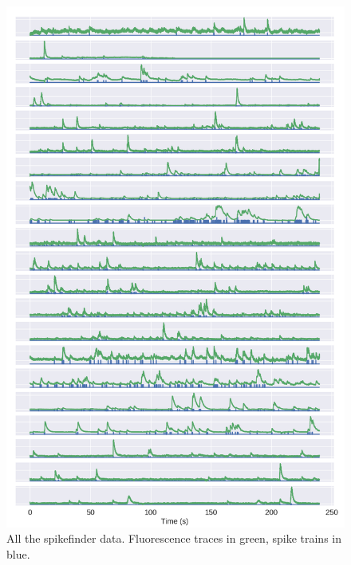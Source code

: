 \documentclass[a4paper,12pt]{article}
\theoremstyle{definition}
\begin{document}
\begin{figure}[p]
  \centering
  \includegraphics[width=\textwidth]{figures/all_spikefinder_data.png}
  \caption{All the spikefinder data. Fluorescence traces in green, spike trains in blue.}
  \label{fig:all_spikefinder_data}
\end{figure}
\end{document}
